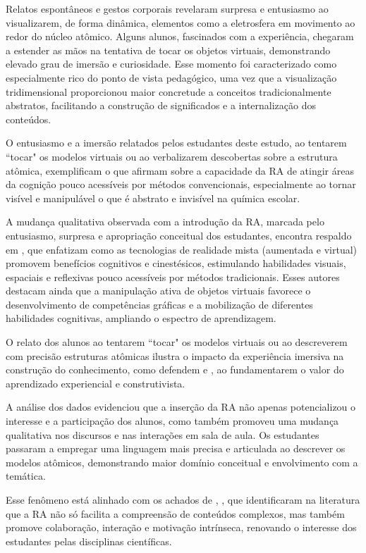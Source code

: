 \documentclass[portuguese]{textolivre}
\begin{document}
Relatos espontâneos e gestos corporais revelaram surpresa e entusiasmo ao visualizarem, de forma dinâmica, elementos como a eletrosfera em movimento ao redor do núcleo atômico. Alguns alunos, fascinados com a experiência, chegaram a estender as mãos na tentativa de tocar os objetos virtuais, demonstrando elevado grau de imersão e curiosidade. Esse momento foi caracterizado como especialmente rico do ponto de vista pedagógico, uma vez que a visualização tridimensional proporcionou maior concretude a conceitos tradicionalmente abstratos, facilitando a construção de significados e a internalização dos conteúdos.

O entusiasmo e a imersão relatados pelos estudantes deste estudo, ao tentarem ``tocar" os modelos virtuais ou ao verbalizarem descobertas sobre a estrutura atômica, exemplificam o que \textcite{pereira2017} afirmam sobre a capacidade da RA de atingir áreas da cognição pouco acessíveis por métodos convencionais, especialmente ao tornar visível e manipulável o que é abstrato e invisível na química escolar.

A mudança qualitativa observada com a introdução da RA, marcada pelo entusiasmo, surpresa e apropriação conceitual dos estudantes, encontra respaldo em \textcite{caberoalmenara2025}, que enfatizam como as tecnologias de realidade mista (aumentada e virtual) promovem benefícios cognitivos e cinestésicos, estimulando habilidades visuais, espaciais e reflexivas pouco acessíveis por métodos tradicionais. Esses autores destacam ainda que a manipulação ativa de objetos virtuais favorece o desenvolvimento de competências gráficas e a mobilização de diferentes habilidades cognitivas, ampliando o espectro de aprendizagem.

O relato dos alunos ao tentarem ``tocar" os modelos virtuais ou ao descreverem com precisão estruturas atômicas ilustra o impacto da experiência imersiva na construção do conhecimento, como defendem \textcite{caberoalmenara2025} e \textcite{gleason2020}, ao fundamentarem o valor do aprendizado experiencial e construtivista.

A análise dos dados evidenciou que a inserção da RA não apenas potencializou o interesse e a participação dos alunos, como também promoveu uma mudança qualitativa nos discursos e nas interações em sala de aula. Os estudantes passaram a empregar uma linguagem mais precisa e articulada ao descrever os modelos atômicos, demonstrando maior domínio conceitual e envolvimento com a temática.

Esse fenômeno está alinhado com os achados de \textcite{bacca2014}, \textcite{huang2018}, que identificaram na literatura que a RA não só facilita a compreensão de conteúdos complexos, mas também promove colaboração, interação e motivação intrínseca, renovando o interesse dos estudantes pelas disciplinas científicas.
\end{document}
